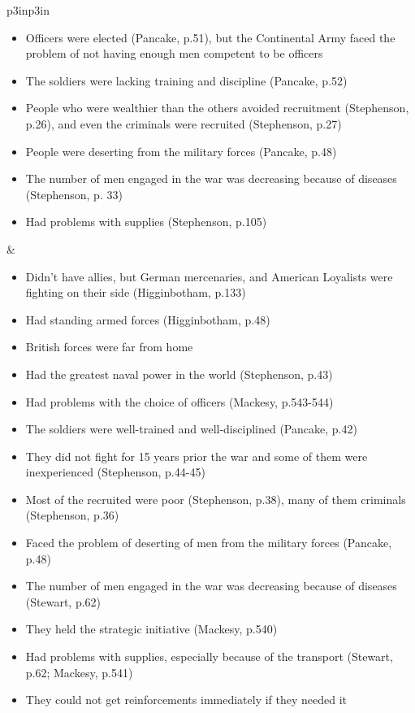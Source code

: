\begin{singlespace}
\begin{mpxtabular}{p{3in}p{3in}}
\begin{itemize}[nolistsep,leftmargin=*]
	    \item  Officers were elected (Pancake, p.51), but the Continental Army faced the problem of not having enough men competent to be officers 
	    \item  The soldiers were lacking training and discipline (Pancake, p.52) 
	    \item  People who were wealthier than the others avoided recruitment (Stephenson, p.26), and even the criminals were recruited (Stephenson, p.27) 
	    \item  People were deserting from the military forces (Pancake, p.48) 
	    \item  The number of men engaged in the war was decreasing because of diseases (Stephenson, p. 33) 
	    \item  Had problems with supplies (Stephenson, p.105)
	\end{itemize}
	&
	\begin{itemize}[nolistsep,leftmargin=*]
	    \item  Didn’t have allies, but German mercenaries, and American Loyalists were fighting on their side (Higginbotham, p.133) 
	    \item  Had standing armed forces (Higginbotham, p.48) 
	    \item  British forces were far from home 
	    \item  Had the greatest naval power in the world (Stephenson, p.43) 
	    \item  Had problems with the choice of officers (Mackesy, p.543-544) 
	    \item  The soldiers were well-trained and well-disciplined (Pancake, p.42) 
	    \item  They did not fight for 15 years prior the war and some of them were inexperienced (Stephenson, p.44-45) 
	    \item  Most of the recruited were poor (Stephenson, p.38), many of them criminals (Stephenson, p.36) 
	    \item  Faced the problem of deserting of men from the military forces (Pancake, p.48) 
	    \item  The number of men engaged in the war was decreasing because of diseases (Stewart, p.62) 
	    \item  They held the strategic initiative (Mackesy, p.540) 
	    \item  Had problems with supplies, especially because of the transport (Stewart, p.62; Mackesy, p.541) 
	    \item  They could not get reinforcements immediately if they needed it

\end{itemize}
\end{mpxtabular}
\end{singlespace}
